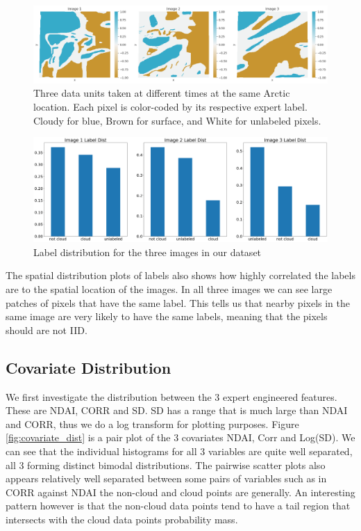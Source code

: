 \documentclass[11pt, letterpaper, journal]{IEEEtran}
\begin{document}
\begin{figure}[!h]
\centering
\includegraphics[width=1.0\textwidth]{1.a.png}
\caption{Three data units taken at different times at the same Arctic location. Each pixel is color-coded by its respective expert label. Cloudy for blue, Brown for surface, and White for unlabeled pixels.}
\label{fig:image_labels}
\end{figure}

\begin{figure}[!h]
\centering
\includegraphics[width=1.0\textwidth]{statics/Label_dist.png}
\caption{Label distribution for the three images in our dataset}
\label{fig:label_dist}
\end{figure}
The spatial distribution plots of labels also shows how highly correlated the labels are to the spatial location of the images. In all three images we can see large patches of pixels that have the same label. This tells us that nearby pixels in the same image are very likely to have the same labels, meaning that the pixels should are not IID.

\subsection{Covariate Distribution}
We first investigate the distribution between the 3 expert engineered features. These are NDAI, CORR and SD. SD has a range that is much large than NDAI and CORR, thus we do a log transform for plotting purposes. Figure \ref{fig:covariate_dist} is a pair plot of the 3 covariates NDAI, Corr and Log(SD). We can see that the individual histograms for all 3 variables are quite well separated, all 3 forming distinct bimodal distributions. The pairwise scatter plots also appears relatively well separated between some pairs of variables such as in CORR against NDAI the non-cloud and cloud points are generally. An interesting pattern however is that the non-cloud data points tend to have a tail region that intersects with the cloud data points probability mass.
\end{document}
